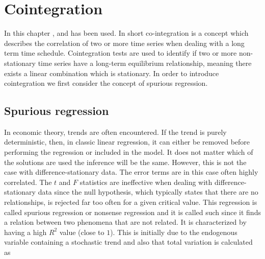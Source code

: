 \chapter{Cointegration}\label{chap:Coint}
In this chapter \cite{Analysis_of_integrated_and_cointegrated_time_series_with_R}, \cite{Cointegration_intro} and \cite{co-Integration_and_error_correction} has been used. 
\pause
In short co-integration is a concept which describes the correlation of two or more time series when dealing with a long term time schedule. Cointegration tests are used to identify if two or more non-stationary time series have a long-term equilibrium relationship, meaning there exists a linear combination which is stationary.
\newline
\noindent In order to introduce cointegration we first consider the concept of spurious regression.



\section{Spurious regression}
In economic theory, trends are often encountered. If the trend is purely deterministic, then, in classic linear regression, it can either be removed before performing the regression or included in the model. It does not matter which of the solutions are used the inference will be the same. However, this is not the case with difference-stationary data. The error terms are in this case often highly correlated. The $t$ and $F$ statistics are ineffective when dealing with difference-stationary data since the null hypothesis, which typically states that there are no relationships, is rejected far too often for a given critical value. This regression is called spurious regression or nonsense regression and it is called such since it finds a relation between two phenomena that are not related. It is characterized by having a high $R^2$ value (close to $1$). This is initially due to the endogenous variable containing a stochastic trend and also that total variation is calculated as


